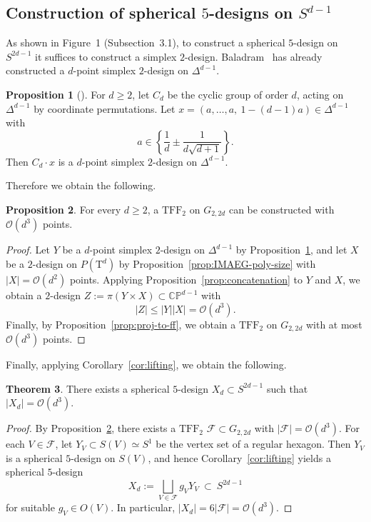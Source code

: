 \documentclass{amsart}
\theoremstyle{definition}
\newtheorem{theorem}{Theorem}[section]
\newtheorem{proposition}[theorem]{Proposition}
\theoremstyle{remark}
\numberwithin{equation}{section}
\newcommand{\CP}{\mathbb{CP}}
\newcommand{\D}{\Delta^{d-1}}
\newcommand{\TFF}{\mathrm{TFF}}
\begin{document}
\subsection{Construction of spherical $5$-designs on $S^{d-1}$}
As shown in Figure~1 (Subsection~3.1), to construct a spherical $5$-design on $S^{2d-1}$ it suffices to construct a simplex $2$-design. Baladram~\cite{Baladram2018} has already constructed a $d$-point simplex $2$-design on $\D$.
\begin{proposition}[{\cite[Cor.~4.1]{Baladram2018}}]\label{cor:baladram-4.1}
For $d\ge 2$, let $C_d$ be the cyclic group of order $d$, acting on $\D$ by coordinate permutations.
Let
\(
x=(a,\ldots,a,\ 1-(d-1)a) \in \D
\)
with
\[
a\in\left\{\frac1d\pm \frac{1}{d\sqrt{d+1}}\right\}.
\]
Then $C_d\cdot x$ is a $d$-point simplex $2$-design on $\D$.
\end{proposition}
Therefore we obtain the following.
\begin{proposition}
\label{prop:cp-design-from-simplex-toric}
For every $d\ge 2$, a $\TFF_2$ on $G_{2,2d}$ can be constructed with $\mathcal{O}(d^{3})$ points.
\end{proposition}

\begin{proof}
Let $Y$ be a $d$-point simplex $2$-design on $\D$ by Proposition~\ref{cor:baladram-4.1}, and let $X$ be a $2$-design on $P(\mathrm{T}^d)$ by Proposition~\ref{prop:IMAEG-poly-size} with $|X|=\mathcal{O}(d^{2})$ points.
Applying Proposition~\ref{prop:concatenation} to $Y$ and $X$, we obtain a $2$-design
$Z:=\pi(Y\times X)\subset\CP^{d-1}$ with
\[
|Z|\le |Y||X|=\mathcal{O}(d^3).
\]
Finally, by Proposition~\ref{prop:proj-to-ff}, we obtain a $\TFF_2$ on $G_{2,2d}$ with at most $\mathcal{O}(d^3)$ points.
\end{proof}
Finally, applying Corollary~\ref{cor:lifting}, we obtain the following.

\begin{theorem}
    \label{thm:even_construction}
There exists a spherical $5$-design $X_d\subset S^{2d-1}$ such that
\(
|X_d|=\mathcal{O}\!\left(d^{3}\right).
\)
\end{theorem}

\begin{proof}
By Proposition~\ref{prop:cp-design-from-simplex-toric}, there exists a $\TFF_2$
\(
\mathcal F\subset G_{2,2d}
\)
with $|\mathcal F|=\mathcal O(d^3)$.
For each $V\in\mathcal F$, let $Y_V\subset S(V)\simeq S^1$ be the vertex set of a regular hexagon.
Then $Y_V$ is a spherical $5$-design on $S(V)$, and hence Corollary~\ref{cor:lifting} yields a spherical $5$-design
\[
X_d:=\bigsqcup_{V\in\mathcal F} g_V Y_V \ \subset\ S^{2d-1}
\]
for suitable $g_V\in O(V)$.
In particular, $|X_d|=6|\mathcal F|=\mathcal O(d^3)$.
\end{proof}
\end{document}
